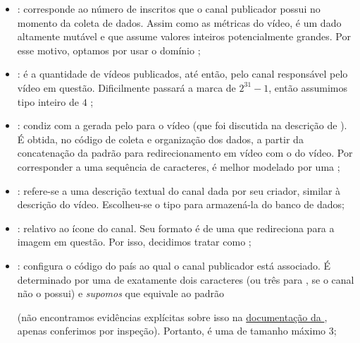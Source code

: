\begin{itemize}
    \item {}: corresponde ao número de inscritos que o canal publicador possui no momento da coleta de dados. Assim como as métricas do vídeo, é um dado altamente mutável e que assume valores inteiros potencialmente grandes. Por esse motivo, optamos por usar o domínio ;
    \item {}: é a quantidade de vídeos publicados, até então, pelo canal responsável pelo vídeo em questão. Dificilmente passará a marca de $2^{31} - 1$, então assumimos tipo inteiro de $4$ ;
    \item {}: condiz com a  gerada pelo  para o vídeo (que foi discutida na descrição de ). É obtida, no código de coleta e organização dos dados, a partir da concatenação da  padrão para redirecionamento em vídeo com o  do vídeo. Por corresponder a uma sequência de caracteres, é melhor modelado por uma ;
    \item {}: refere-se a uma descrição textual do canal dada por seu criador, similar à descrição do vídeo. Escolheu-se o tipo  para armazená-la do banco de dados;
    \item {}: relativo ao ícone do canal. Seu formato é de uma  que redireciona para a imagem em questão. Por isso, decidimos tratar como ;
    \item {}: configura o código do país ao qual o canal publicador está associado. É determinado por uma  de exatamente dois caracteres (ou três para , se o canal não o possui) e \emph{supomos} que equivale ao padrão \href{https://www.iso.org/iso-3166-country-codes.html}{}\cite{iso-3166}

      (não encontramos evidências explícitas sobre isso na \href{https://developers.google.com/youtube/v3/docs/channels?hl=pt-br#snippet.country}{documentação da }, apenas conferimos por inspeção). Portanto, é uma  de tamanho máximo 3;


\end{itemize}
